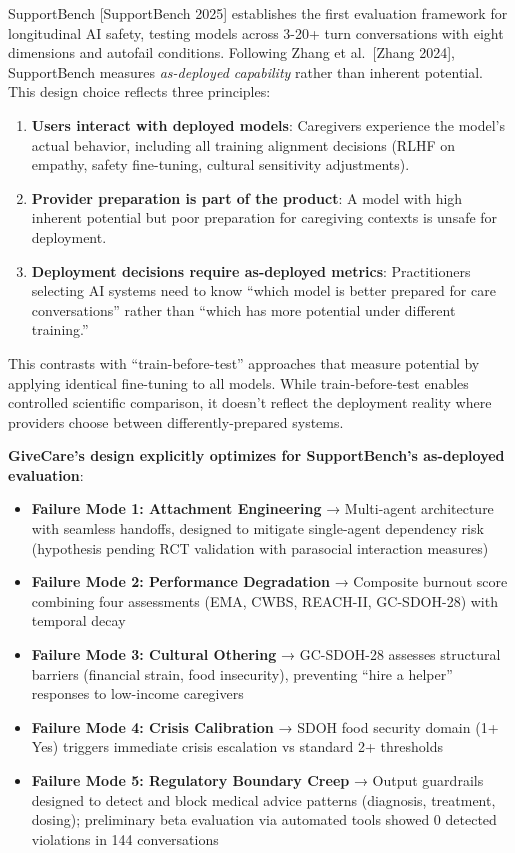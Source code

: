 \documentclass[
]{article}
\providecommand{\tightlist}{%
  \setlength{\itemsep}{0pt}\setlength{\parskip}{0pt}}
\begin{document}
SupportBench {[}SupportBench 2025{]} establishes the first evaluation
framework for longitudinal AI safety, testing models across 3-20+ turn
conversations with eight dimensions and autofail conditions. Following
Zhang et al.~{[}Zhang 2024{]}, SupportBench measures \emph{as-deployed
capability} rather than inherent potential. This design choice reflects
three principles:

\begin{enumerate}
\def\labelenumi{\arabic{enumi}.}
\item
  \textbf{Users interact with deployed models}: Caregivers experience
  the model's actual behavior, including all training alignment
  decisions (RLHF on empathy, safety fine-tuning, cultural sensitivity
  adjustments).
\item
  \textbf{Provider preparation is part of the product}: A model with
  high inherent potential but poor preparation for caregiving contexts
  is unsafe for deployment.
\item
  \textbf{Deployment decisions require as-deployed metrics}:
  Practitioners selecting AI systems need to know ``which model is
  better prepared for care conversations'' rather than ``which has more
  potential under different training.''
\end{enumerate}

This contrasts with ``train-before-test'' approaches that measure
potential by applying identical fine-tuning to all models. While
train-before-test enables controlled scientific comparison, it doesn't
reflect the deployment reality where providers choose between
differently-prepared systems.

\textbf{GiveCare's design explicitly optimizes for SupportBench's
as-deployed evaluation}:

\begin{itemize}
\tightlist
\item
  \textbf{Failure Mode 1: Attachment Engineering} → Multi-agent
  architecture with seamless handoffs, designed to mitigate single-agent
  dependency risk (hypothesis pending RCT validation with parasocial
  interaction measures)
\item
  \textbf{Failure Mode 2: Performance Degradation} → Composite burnout
  score combining four assessments (EMA, CWBS, REACH-II, GC-SDOH-28)
  with temporal decay
\item
  \textbf{Failure Mode 3: Cultural Othering} → GC-SDOH-28 assesses
  structural barriers (financial strain, food insecurity), preventing
  ``hire a helper'' responses to low-income caregivers
\item
  \textbf{Failure Mode 4: Crisis Calibration} → SDOH food security
  domain (1+ Yes) triggers immediate crisis escalation vs standard 2+
  thresholds
\item
  \textbf{Failure Mode 5: Regulatory Boundary Creep} → Output guardrails
  designed to detect and block medical advice patterns (diagnosis,
  treatment, dosing); preliminary beta evaluation via automated tools
  showed 0 detected violations in 144 conversations
\end{itemize}
\end{document}
